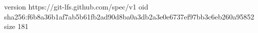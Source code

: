 version https://git-lfs.github.com/spec/v1
oid sha256:f6b8a36b1af7ab5b61fb2ad90d8ba0a3db2a3e0e6737ef97bb3c6eb260a95852
size 181
